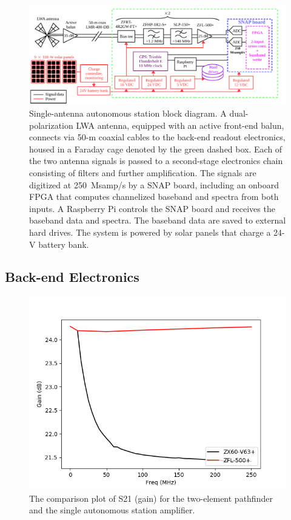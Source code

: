 \begin{figure}
	\begin{center}
		\includegraphics[width=\linewidth]{Figures/albatros_single_schematic.pdf}
		\caption{Single-antenna autonomous station block diagram. A dual-polarization LWA antenna, equipped with an active front-end balun, connects via 50-m coaxial cables to the back-end readout electronics, housed in a Faraday cage denoted by the green dashed box. Each of the two antenna signals is passed to a second-stage electronics chain consisting of filters and further amplification.  The signals are digitized at 250~Msamp/s by a SNAP board, including an onboard FPGA that computes channelized baseband and spectra from both inputs.  A Raspberry Pi controls the SNAP board and receives the baseband data and spectra. The baseband data are saved to external hard drives. The system is powered by solar panels that charge a 24-V battery bank.}
		\label{Fig:albatros1_schem}
	\end{center}
\end{figure}

\subsection{Back-end Electronics} 

\begin{figure}
	\begin{center}
		\includegraphics[width=0.8\linewidth]{Figures/foo.png}
		\caption{The comparison plot of S21 (gain) for the two-element pathfinder and the single autonomous station amplifier.}
		\label{Fig:foo}
	\end{center}
\end{figure}

